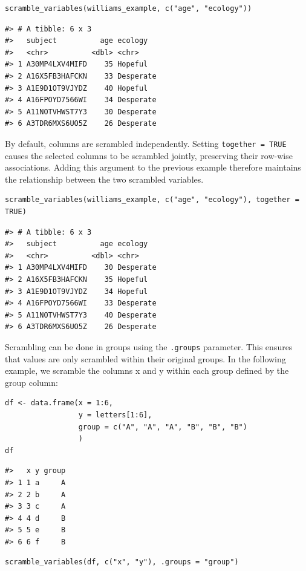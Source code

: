 \begin{verbatim}
scramble_variables(williams_example, c("age", "ecology"))
\end{verbatim}

\begin{verbatim}
#> # A tibble: 6 x 3
#>   subject          age ecology  
#>   <chr>          <dbl> <chr>    
#> 1 A30MP4LXV4MIFD    35 Hopeful  
#> 2 A16X5FB3HAFCKN    33 Desperate
#> 3 A1E9D1OT9VJYDZ    40 Hopeful  
#> 4 A16FPOYD7566WI    34 Desperate
#> 5 A11NOTVHWST7Y3    30 Desperate
#> 6 A3TDR6MXS6UO5Z    26 Desperate
\end{verbatim}

By default, columns are scrambled independently. Setting \texttt{together\ =\ TRUE} causes the selected columns to be scrambled jointly, preserving their row-wise associations. Adding this argument to the previous example therefore maintains the relationship between the two scrambled variables.

\begin{verbatim}
scramble_variables(williams_example, c("age", "ecology"), together = TRUE)
\end{verbatim}

\begin{verbatim}
#> # A tibble: 6 x 3
#>   subject          age ecology  
#>   <chr>          <dbl> <chr>    
#> 1 A30MP4LXV4MIFD    30 Desperate
#> 2 A16X5FB3HAFCKN    35 Hopeful  
#> 3 A1E9D1OT9VJYDZ    34 Hopeful  
#> 4 A16FPOYD7566WI    33 Desperate
#> 5 A11NOTVHWST7Y3    40 Desperate
#> 6 A3TDR6MXS6UO5Z    26 Desperate
\end{verbatim}

Scrambling can be done in groups using the \texttt{.groups} parameter. This ensures that values are only scrambled within their original groups. In the following example, we scramble the columns x and y within each group defined by the group column:

\begin{verbatim}
df <- data.frame(x = 1:6,
                 y = letters[1:6],
                 group = c("A", "A", "A", "B", "B", "B")
                 )
df 
\end{verbatim}

\begin{verbatim}
#>   x y group
#> 1 1 a     A
#> 2 2 b     A
#> 3 3 c     A
#> 4 4 d     B
#> 5 5 e     B
#> 6 6 f     B
\end{verbatim}

\begin{verbatim}
scramble_variables(df, c("x", "y"), .groups = "group")
\end{verbatim}

